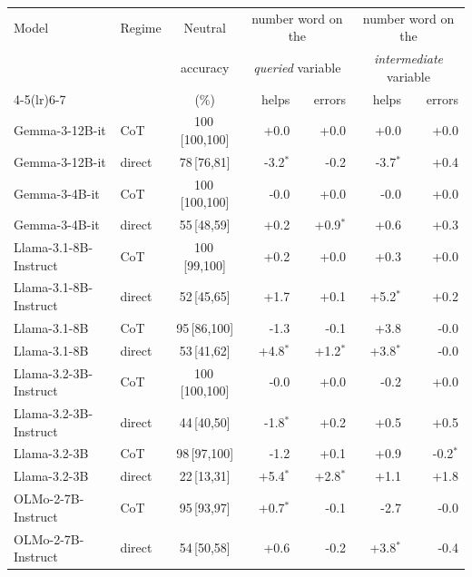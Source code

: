 \begin{tabular}{llcrrrr}
\toprule
Model & Regime & Neutral & \multicolumn{2}{c}{number word on the} & \multicolumn{2}{c}{number word on the} \\
& & accuracy & \multicolumn{2}{c}{\emph{queried} variable} & \multicolumn{2}{c}{\emph{intermediate} variable} \\
\cmidrule(lr){4-5}\cmidrule(lr){6-7}
& & (\%) & helps & errors & helps & errors \\
\midrule
Gemma-3-12B-it & CoT & 100\,{\scriptsize[100,100]} & +0.0 & +0.0 & +0.0 & +0.0 \\
Gemma-3-12B-it & direct & 78\,{\scriptsize[76,81]} & -3.2$^{*}$ & -0.2 & -3.7$^{*}$ & +0.4 \\
\addlinespace
Gemma-3-4B-it & CoT & 100\,{\scriptsize[100,100]} & -0.0 & +0.0 & -0.0 & +0.0 \\
Gemma-3-4B-it & direct & 55\,{\scriptsize[48,59]} & +0.2 & +0.9$^{*}$ & +0.6 & +0.3 \\
\addlinespace
Llama-3.1-8B-Instruct & CoT & 100\,{\scriptsize[99,100]} & +0.2 & +0.0 & +0.3 & +0.0 \\
Llama-3.1-8B-Instruct & direct & 52\,{\scriptsize[45,65]} & +1.7 & +0.1 & +5.2$^{*}$ & +0.2 \\
\addlinespace
Llama-3.1-8B & CoT & 95\,{\scriptsize[86,100]} & -1.3 & -0.1 & +3.8 & -0.0 \\
Llama-3.1-8B & direct & 53\,{\scriptsize[41,62]} & +4.8$^{*}$ & +1.2$^{*}$ & +3.8$^{*}$ & -0.0 \\
\addlinespace
Llama-3.2-3B-Instruct & CoT & 100\,{\scriptsize[100,100]} & -0.0 & +0.0 & -0.2 & +0.0 \\
Llama-3.2-3B-Instruct & direct & 44\,{\scriptsize[40,50]} & -1.8$^{*}$ & +0.2 & +0.5 & +0.5 \\
\addlinespace
Llama-3.2-3B & CoT & 98\,{\scriptsize[97,100]} & -1.2 & +0.1 & +0.9 & -0.2$^{*}$ \\
Llama-3.2-3B & direct & 22\,{\scriptsize[13,31]} & +5.4$^{*}$ & +2.8$^{*}$ & +1.1 & +1.8 \\
\addlinespace
OLMo-2-7B-Instruct & CoT & 95\,{\scriptsize[93,97]} & +0.7$^{*}$ & -0.1 & -2.7 & -0.0 \\
OLMo-2-7B-Instruct & direct & 54\,{\scriptsize[50,58]} & +0.6 & -0.2 & +3.8$^{*}$ & -0.4 \\
\bottomrule
\end{tabular}
